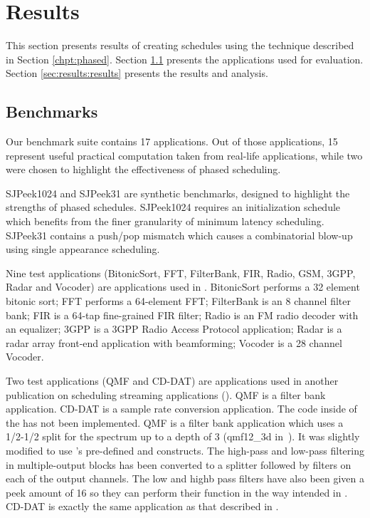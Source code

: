 \section{Results}
\label{chpt:results}

This section presents results of creating schedules using the
technique described in Section \ref{chpt:phased}.  Section
\ref{sec:results:apps} presents the applications used for evaluation.
Section \ref{sec:results:results} presents the results and analysis.

\subsection{Benchmarks}
\label{sec:results:apps}

Our benchmark suite contains 17 applications. Out of those
applications, 15 represent useful practical computation taken from
real-life applications, while two were chosen to highlight the
effectiveness of phased scheduling.

SJPeek1024 and SJPeek31 are synthetic benchmarks, designed to
highlight the strengths of phased schedules. SJPeek1024 requires an
initialization schedule which benefits from the finer granularity of
minimum latency scheduling. SJPeek31 contains a push/pop mismatch
which causes a combinatorial blow-up using single appearance
scheduling.

Nine test applications (BitonicSort, FFT, FilterBank, FIR, Radio, GSM,
3GPP, Radar and Vocoder) are applications used in
\cite{Gordo02}. BitonicSort performs a 32 element bitonic sort; FFT
performs a 64-element FFT; FilterBank is an 8 channel filter bank; FIR
is a 64-tap fine-grained FIR filter; Radio is an FM radio decoder with
an equalizer; 3GPP is a 3GPP Radio Access Protocol application; Radar
is a radar array front-end application with beamforming; Vocoder is a
28 channel Vocoder.

Two test applications (QMF and CD-DAT) are applications used in
another publication on scheduling streaming applications
(\cite{murthy99buffer}). QMF is a filter bank application. CD-DAT is a
sample rate conversion application. The code inside of the {\filters}
has not been implemented. QMF is a filter bank application which uses
a 1/2-1/2 split for the spectrum up to a depth of 3 (qmf12\_3d
in~\cite{murthy99buffer}).  It was slightly modified to use
{\StreamIt}'s pre-defined {\splitter} and {\joiner} constructs.  The
high-pass and low-pass filtering in multiple-output blocks has been
converted to a splitter followed by filters on each of the output
channels. The low and highb pass filters have also been given a peek
amount of 16 so they can perform their function in the way intended in
{\StreamIt}.  CD-DAT is exactly the same application as that described
in \cite{murthy99buffer}.

